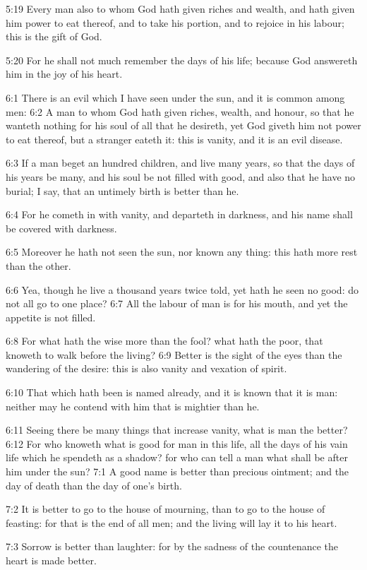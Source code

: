 5:19 Every man also to whom God hath given riches and wealth, and hath
given him power to eat thereof, and to take his portion, and to
rejoice in his labour; this is the gift of God.

5:20 For he shall not much remember the days of his life; because God
answereth him in the joy of his heart.

6:1 There is an evil which I have seen under the sun, and it is common
among men: 6:2 A man to whom God hath given riches, wealth, and
honour, so that he wanteth nothing for his soul of all that he
desireth, yet God giveth him not power to eat thereof, but a stranger
eateth it: this is vanity, and it is an evil disease.

6:3 If a man beget an hundred children, and live many years, so that
the days of his years be many, and his soul be not filled with good,
and also that he have no burial; I say, that an untimely birth is
better than he.

6:4 For he cometh in with vanity, and departeth in darkness, and his
name shall be covered with darkness.

6:5 Moreover he hath not seen the sun, nor known any thing: this hath
more rest than the other.

6:6 Yea, though he live a thousand years twice told, yet hath he seen
no good: do not all go to one place?  6:7 All the labour of man is for
his mouth, and yet the appetite is not filled.

6:8 For what hath the wise more than the fool? what hath the poor,
that knoweth to walk before the living?  6:9 Better is the sight of
the eyes than the wandering of the desire: this is also vanity and
vexation of spirit.

6:10 That which hath been is named already, and it is known that it is
man: neither may he contend with him that is mightier than he.

6:11 Seeing there be many things that increase vanity, what is man the
better?  6:12 For who knoweth what is good for man in this life, all
the days of his vain life which he spendeth as a shadow? for who can
tell a man what shall be after him under the sun?  7:1 A good name is
better than precious ointment; and the day of death than the day of
one's birth.

7:2 It is better to go to the house of mourning, than to go to the
house of feasting: for that is the end of all men; and the living will
lay it to his heart.

7:3 Sorrow is better than laughter: for by the sadness of the
countenance the heart is made better.


